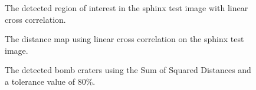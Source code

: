 \begin{figure}
	\centering
	\begin{minipage}[t]{0.49\linewidth}
		\centering
		\caption{The detected region of interest in the sphinx test image with linear cross correlation.}
		\label{fig:8_3}
	\end{minipage}
	\hfill
	\begin{minipage}[t]{0.49\linewidth}
		\centering
		\caption{The distance map using linear cross correlation on the sphinx test image.}
		\label{fig:8_4}
	\end{minipage}
\end{figure}

\begin{figure}
	\centering
	\caption{The detected bomb craters using the Sum of Squared Distances and a tolerance value of 80\%.}
	\label{fig:8_5}
\end{figure}
